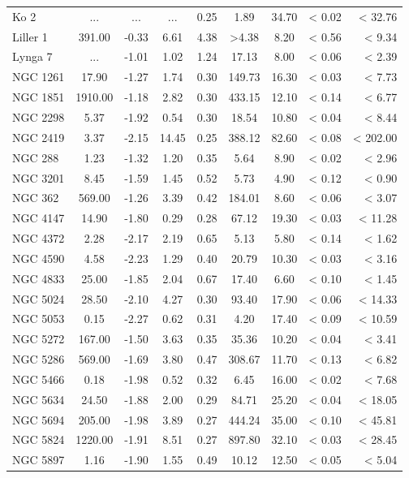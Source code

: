 \documentclass[doublespace,draft,nopageskip]{VTthesis} %
\begin{document}
\begin{appendices}
\begin{table}
\begin{tabular}{lcccccccr}
Ko 2 & ... & ... & ... & 0.25 & 1.89 & 34.70 & < 0.02 & < 32.76\\
Liller 1 & 391.00 & -0.33 & 6.61 & 4.38 & >4.38 & 8.20 & < 0.56 & < 9.34\\
Lynga 7 & ... & -1.01 & 1.02 & 1.24 & 17.13 & 8.00 & < 0.06 & < 2.39\\
NGC 1261 & 17.90 & -1.27 & 1.74 & 0.30 & 149.73 & 16.30 & < 0.03 & < 7.73\\
NGC 1851 & 1910.00 & -1.18 & 2.82 & 0.30 & 433.15 & 12.10 & < 0.14 & < 6.77\\
NGC 2298 & 5.37 & -1.92 & 0.54 & 0.30 & 18.54 & 10.80 & < 0.04 & < 8.44\\
NGC 2419 & 3.37 & -2.15 & 14.45 & 0.25 & 388.12 & 82.60 & < 0.08 & < 202.00\\
NGC 288 & 1.23 & -1.32 & 1.20 & 0.35 & 5.64 & 8.90 & < 0.02 & < 2.96\\
NGC 3201 & 8.45 & -1.59 & 1.45 & 0.52 & 5.73 & 4.90 & < 0.12 & < 0.90\\
NGC 362 & 569.00 & -1.26 & 3.39 & 0.42 & 184.01 & 8.60 & < 0.06 & < 3.07\\
NGC 4147 & 14.90 & -1.80 & 0.29 & 0.28 & 67.12 & 19.30 & < 0.03 & < 11.28\\
NGC 4372 & 2.28 & -2.17 & 2.19 & 0.65 & 5.13 & 5.80 & < 0.14 & < 1.62\\
NGC 4590 & 4.58 & -2.23 & 1.29 & 0.40 & 20.79 & 10.30 & < 0.03 & < 3.16\\
NGC 4833 & 25.00 & -1.85 & 2.04 & 0.67 & 17.40 & 6.60 & < 0.10 & < 1.45\\
NGC 5024 & 28.50 & -2.10 & 4.27 & 0.30 & 93.40 & 17.90 & < 0.06 & < 14.33\\
NGC 5053 & 0.15 & -2.27 & 0.62 & 0.31 & 4.20 & 17.40 & < 0.09 & < 10.59\\
NGC 5272 & 167.00 & -1.50 & 3.63 & 0.35 & 35.36 & 10.20 & < 0.04 & < 3.41\\
NGC 5286 & 569.00 & -1.69 & 3.80 & 0.47 & 308.67 & 11.70 & < 0.13 & < 6.82\\
NGC 5466 & 0.18 & -1.98 & 0.52 & 0.32 & 6.45 & 16.00 & < 0.02 & < 7.68\\
NGC 5634 & 24.50 & -1.88 & 2.00 & 0.29 & 84.71 & 25.20 & < 0.04 & < 18.05\\
NGC 5694 & 205.00 & -1.98 & 3.89 & 0.27 & 444.24 & 35.00 & < 0.10 & < 45.81\\
NGC 5824 & 1220.00 & -1.91 & 8.51 & 0.27 & 897.80 & 32.10 & < 0.03 & < 28.45\\
NGC 5897 & 1.16 & -1.90 & 1.55 & 0.49 & 10.12 & 12.50 & < 0.05 & < 5.04\\

\end{tabular}
\end{table}
\end{appendices}
\end{document}
